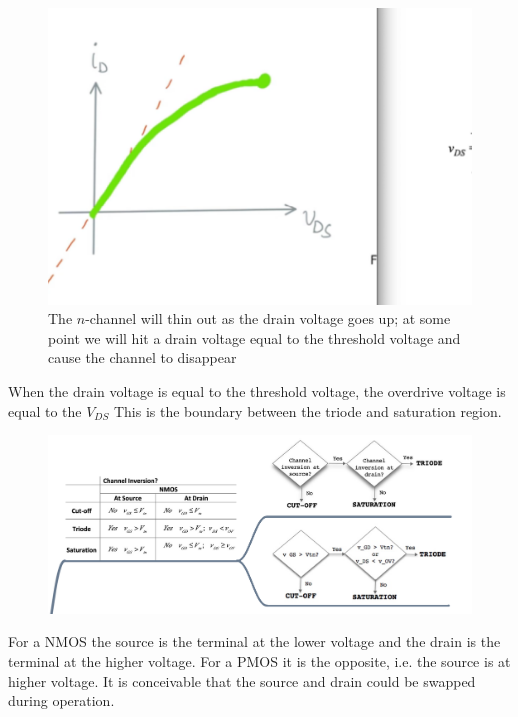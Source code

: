 \documentclass[../notes.tex]{subfiles}
\begin{document}
\begin{figure}[H]
	\centering
	\includegraphics[width=0.8\linewidth]{img/image_2022-10-20-01-15-19.png}
	\caption{The $ n $-channel will thin out as the drain voltage goes up; at some point we will hit a drain voltage equal to the threshold voltage and cause the channel to disappear}
\end{figure}

When the drain voltage is equal to the threshold voltage, the overdrive voltage is equal to the $ V_{DS} $ This is the boundary between the triode and saturation region.



\begin{figure}[H]
	\centering
	\includegraphics[width=0.8\linewidth]{img/image_2022-10-20-01-04-58.png}
\end{figure}


\begin{remark}
	For a NMOS the source is the terminal at the lower voltage and the drain is the terminal at the higher voltage. For a PMOS it is the opposite, i.e. the source is at higher voltage.
	It is conceivable that the source and drain could be swapped during operation.
\end{remark}
\end{document}
